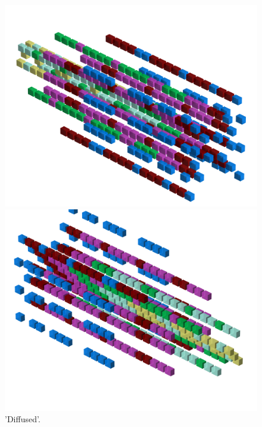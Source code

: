 \begin{figure}[H]
    \centering
    \begin{adjustbox}{width=12cm,center}
      \includegraphics[width=12cm]{src/patterns/pattern5-45.png}%
    \end{adjustbox}
    \begin{adjustbox}{width=12cm,margin=0cm -4cm}
      \includegraphics[width=12cm]{src/patterns/pattern5-225.png}%
    \end{adjustbox}
\caption{'Diffused'.}
\end{figure}
\clearpage

